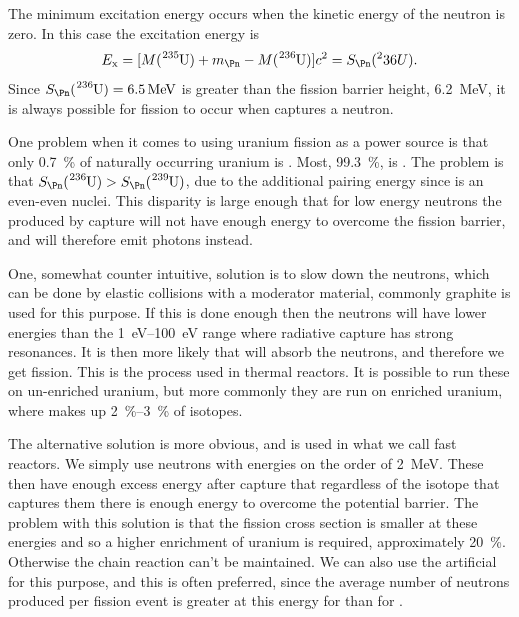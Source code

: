 \documentclass[fleqn]{NotesClass}
\begin{document}
    The minimum excitation energy occurs when the kinetic energy of the neutron is zero.
    In this case the excitation energy is
    \begin{equation}
        E_{\mathrm{x}} = [M(\ce{^235U}) + m_{\Pn} - M(\ce{^{236}U})]c^2 = S_{\Pn}(^236U).
    \end{equation}
    Since \(S_\Pn(\ce{^{236}U}) = \qty{6.5}{\MeV}\) is greater than the fission barrier height, \qty{6.2}{\MeV}, it is always possible for fission to occur when  captures a neutron.
    
    One problem when it comes to using uranium fission as a power source is that only \qty{0.7}{\percent} of naturally occurring uranium is .
    Most, \qty{99.3}{\percent}, is .
    The problem is that \(S_{\Pn}(\ce{^236U}) > S_{\Pn}(\ce{^239U})\), due to the additional pairing energy since  is an even-even nuclei.
    This disparity is large enough that for low energy neutrons the  produced by capture will not have enough energy to overcome the fission barrier, and will therefore emit photons instead.
    
    One, somewhat counter intuitive, solution is to slow down the neutrons, which can be done by elastic collisions with a moderator material, commonly graphite is used for this purpose.
    If this is done enough then the neutrons will have lower energies than the \qtyrange{1}{100}{\electronvolt} range where radiative capture has strong resonances.
    It is then more likely that  will absorb the neutrons, and therefore we get fission.
    This is the process used in thermal reactors.
    It is possible to run these on un-enriched uranium, but more commonly they are run on enriched uranium, where  makes up \qtyrange{2}{3}{\percent} of isotopes.
    
    The alternative solution is more obvious, and is used in what we call fast reactors.
    We simply use neutrons with energies on the order of \qty{2}{\MeV}.
    These then have enough excess energy after capture that regardless of the isotope that captures them there is enough energy to overcome the potential barrier.
    The problem with this solution is that the fission cross section is smaller at these energies and so a higher enrichment of uranium is required, approximately \qty{20}{\percent}.
    Otherwise the chain reaction can't be maintained.
    We can also use the artificial  for this purpose, and this is often preferred, since the average number of neutrons produced per fission event is greater at this energy for  than for .
    
\end{document}

